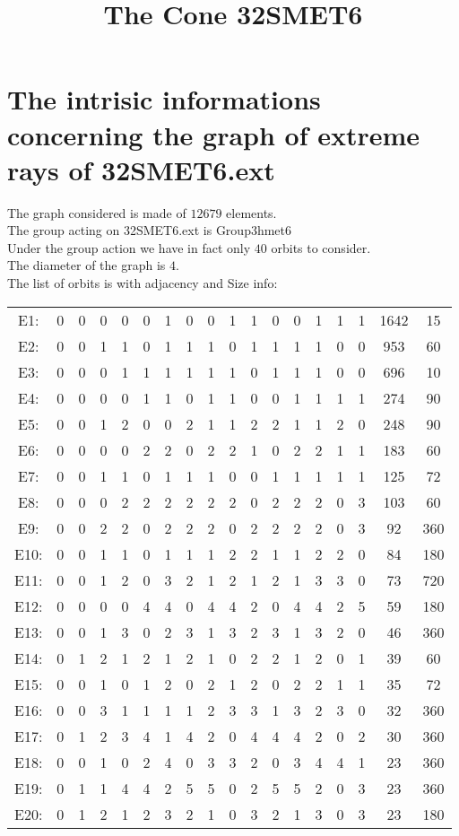 \documentclass[12pt]{article}
\title{The Cone 32SMET6}
\begin{document}
\maketitle
\section{The intrisic informations concerning the graph of extreme rays of 32SMET6.ext}
The graph considered is made of $12679$ elements.\\
The group acting on 32SMET6.ext is Group3hmet6\\
Under the group action we have in fact only $40$ orbits to consider.\\
The diameter of the graph is $4$.\\
The list of orbits is with adjacency and Size info:
\begin{center}
\scriptsize
\begin{tabular}{cccccccccccccccc|c|c}
E1:&0&0&0&0&0&1&0&0&1&1&0&0&1&1&1&1642&15\\
E2:&0&0&1&1&0&1&1&1&0&1&1&1&1&0&0&953&60\\
E3:&0&0&0&1&1&1&1&1&1&0&1&1&1&0&0&696&10\\
E4:&0&0&0&0&1&1&0&1&1&0&0&1&1&1&1&274&90\\
E5:&0&0&1&2&0&0&2&1&1&2&2&1&1&2&0&248&90\\
E6:&0&0&0&0&2&2&0&2&2&1&0&2&2&1&1&183&60\\
E7:&0&0&1&1&0&1&1&1&0&0&1&1&1&1&1&125&72\\
E8:&0&0&0&2&2&2&2&2&2&0&2&2&2&0&3&103&60\\
E9:&0&0&2&2&0&2&2&2&0&2&2&2&2&0&3&92&360\\
E10:&0&0&1&1&0&1&1&1&2&2&1&1&2&2&0&84&180\\
E11:&0&0&1&2&0&3&2&1&2&1&2&1&3&3&0&73&720\\
E12:&0&0&0&0&4&4&0&4&4&2&0&4&4&2&5&59&180\\
E13:&0&0&1&3&0&2&3&1&3&2&3&1&3&2&0&46&360\\
E14:&0&1&2&1&2&1&2&1&0&2&2&1&2&0&1&39&60\\
E15:&0&0&1&0&1&2&0&2&1&2&0&2&2&1&1&35&72\\
E16:&0&0&3&1&1&1&1&2&3&3&1&3&2&3&0&32&360\\
E17:&0&1&2&3&4&1&4&2&0&4&4&4&2&0&2&30&360\\
E18:&0&0&1&0&2&4&0&3&3&2&0&3&4&4&1&23&360\\
E19:&0&1&1&4&4&2&5&5&0&2&5&5&2&0&3&23&360\\
E20:&0&1&2&1&2&3&2&1&0&3&2&1&3&0&3&23&180\\

\end{tabular}
\end{center}
\end{document}
